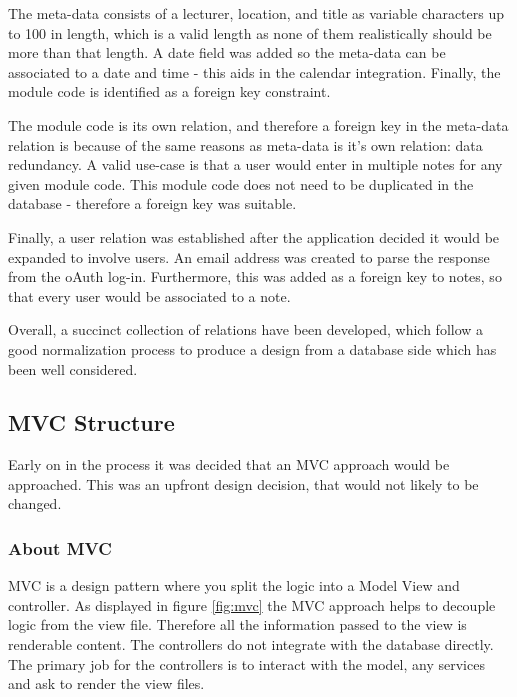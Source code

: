 The meta-data consists of a lecturer, location, and title as variable characters up to 100 in length, which is a valid length as none of them realistically should be more than that length. A date field was added so the meta-data can be associated to a date and time - this aids in the calendar integration. Finally, the module code is identified as a foreign key constraint.

The module code is its own relation, and therefore a foreign key in the meta-data relation is because of the same reasons as meta-data is it's own relation: data redundancy. A valid use-case is that a user would enter in multiple notes for any given module code. This module code does not need to be duplicated in the database - therefore a foreign key was suitable.

Finally, a user relation was established after the application decided it would be expanded to involve users. An email address was created to parse the response from the oAuth log-in. Furthermore, this was added as a foreign key to notes, so that every user would be associated to a note.

Overall, a succinct collection of relations have been developed, which follow a good normalization process to produce a design from a database side which has been well considered.



\subsection{MVC Structure}
Early on in the process it was decided that an MVC approach would be approached. This was an upfront design decision, that would not likely to be changed.

\subsubsection{About MVC}
MVC is a design pattern where you split the logic into a Model View and controller. As displayed in figure \ref{fig:mvc} the MVC approach helps to decouple logic from the view file. Therefore all the information passed to the view is renderable content. The controllers do not integrate with the database directly. The primary job for the controllers is to interact with the model, any services and ask to render the view files.

